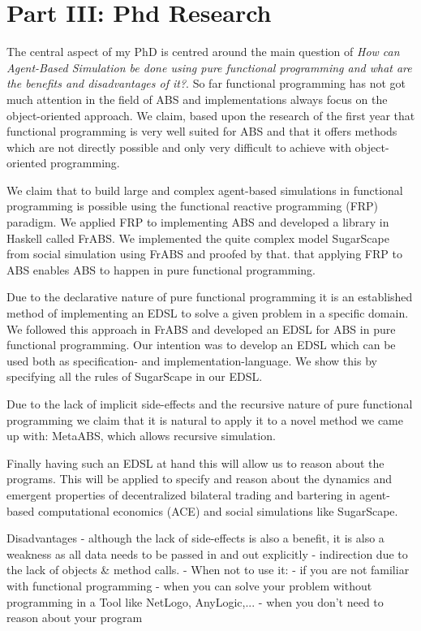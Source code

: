 \section{Part III: Phd Research} 
The central aspect of my PhD is centred around the main question of \textit{How can Agent-Based Simulation be done using pure functional programming and what are the benefits and disadvantages of it?}. So far functional programming has not got much attention in the field of ABS and implementations always focus on the object-oriented approach. We claim, based upon the research of the first year that functional programming is very well suited for ABS and that it offers methods which are not directly possible and only very difficult to achieve with object-oriented programming.

We claim that to build large and complex agent-based simulations in functional programming is possible using the functional reactive programming (FRP) paradigm. We applied FRP to implementing ABS and developed a library in Haskell called FrABS. We implemented the quite complex model SugarScape from social simulation using FrABS and proofed by that. that applying FRP to ABS enables ABS to happen in pure functional programming.

Due to the declarative nature of pure functional programming it is an established method of implementing an EDSL to solve a given problem in a specific domain. We followed this approach in FrABS and developed an EDSL for ABS in pure functional programming. Our intention was to develop an EDSL which can be used both as specification- and implementation-language. We show this by specifying all the rules of SugarScape in our EDSL.

Due to the lack of implicit side-effects and the recursive nature of pure functional programming we claim that it is natural to apply it to a novel method we came up with: MetaABS, which allows recursive simulation.

Finally having such an EDSL at hand this will allow us to reason about the programs. This will be applied to specify and reason about the dynamics and emergent properties of decentralized bilateral trading and bartering in agent-based computational economics (ACE) and social simulations like SugarScape.

Disadvantages
- although the lack of side-effects is also a benefit, it is also a weakness as all data needs to be passed in and out explicitly 
- indirection due to the lack of objects \& method calls.
- When not to use it: 
	- if you are not familiar with functional programming
	- when you can solve your problem without programming in a Tool like NetLogo, AnyLogic,...
	- when you don't need to reason about your program


